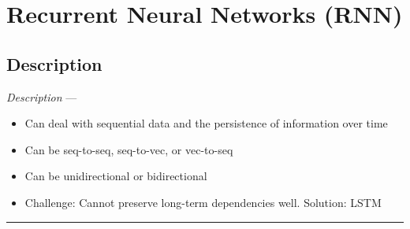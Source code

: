 \section{Recurrent Neural Networks (RNN)}
\subsection*{Description}
\emph{Description} --- 
\begin{itemize}
    \item Can deal with sequential data and the persistence of information over time
    \item Can be seq-to-seq, seq-to-vec, or vec-to-seq
    \item Can be unidirectional or bidirectional
    \item Challenge: Cannot preserve long-term dependencies well. Solution: LSTM
\end{itemize}

{\color{black}\hrule height 0.001mm}

